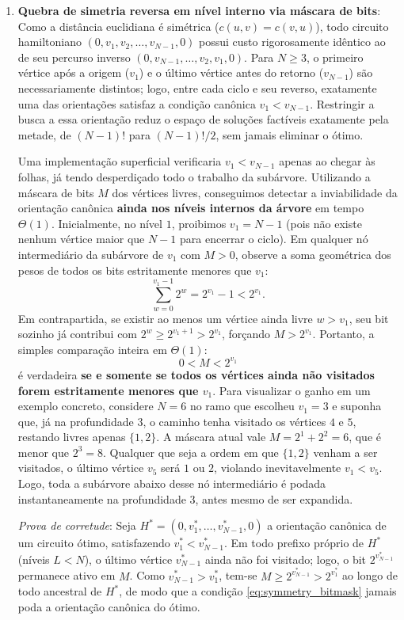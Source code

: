 \begin{enumerate}
  \item \textbf{Quebra de simetria reversa em nível interno via máscara de bits}:
  Como a distância euclidiana é simétrica ($c(u, v) = c(v, u)$), todo circuito hamiltoniano
  $(0, v_1, v_2, \dots, v_{N-1}, 0)$ possui custo rigorosamente idêntico ao de seu percurso
  inverso $(0, v_{N-1}, \dots, v_2, v_1, 0)$. Para $N \ge 3$, o primeiro vértice após a origem
  ($v_1$) e o último vértice antes do retorno ($v_{N-1}$) são necessariamente distintos; logo,
  entre cada ciclo e seu reverso, exatamente uma das orientações satisfaz a condição canônica
  $v_1 < v_{N-1}$. Restringir a busca a essa orientação reduz o espaço de soluções factíveis
  exatamente pela metade, de $(N - 1)!$ para $(N - 1)!/2$, sem jamais eliminar o ótimo.

  Uma implementação superficial verificaria $v_1 < v_{N-1}$ apenas ao chegar às folhas, já tendo
  desperdiçado todo o trabalho da subárvore. Utilizando a máscara de bits $M$ dos vértices
  livres, conseguimos detectar a inviabilidade da orientação canônica \textbf{ainda nos níveis
  internos da árvore} em tempo $\Theta(1)$. Inicialmente, no nível $1$, proibimos $v_1 = N - 1$
  (pois não existe nenhum vértice maior que $N - 1$ para encerrar o ciclo). Em qualquer nó
  intermediário da subárvore de $v_1$ com $M > 0$, observe a soma geométrica dos pesos de todos
  os bits estritamente menores que $v_1$:
  \begin{equation}
    \sum_{w = 0}^{v_1 - 1} 2^w = 2^{v_1} - 1 < 2^{v_1}.
  \end{equation}
  Em contrapartida, se existir ao menos um vértice ainda livre $w > v_1$, seu bit sozinho já
  contribui com $2^w \ge 2^{v_1 + 1} > 2^{v_1}$, forçando $M > 2^{v_1}$. Portanto, a simples
  comparação inteira em $\Theta(1)$:
  \begin{equation}
    0 < M < 2^{v_1}
    \label{eq:symmetry_bitmask}
  \end{equation}
  é verdadeira \textbf{se e somente se todos os vértices ainda não visitados forem estritamente
  menores que $v_1$}. Para visualizar o ganho em um exemplo concreto, considere $N = 6$ no ramo
  que escolheu $v_1 = 3$ e suponha que, já na profundidade $3$, o caminho tenha visitado os
  vértices $4$ e $5$, restando livres apenas $\{1, 2\}$. A máscara atual vale
  $M = 2^1 + 2^2 = 6$, que é menor que $2^3 = 8$. Qualquer que seja a ordem em que $\{1, 2\}$
  venham a ser visitados, o último vértice $v_5$ será $1$ ou $2$, violando inevitavelmente
  $v_1 < v_5$. Logo, toda a subárvore abaixo desse nó intermediário é podada instantaneamente
  na profundidade $3$, antes mesmo de ser expandida.

  \textit{Prova de corretude}: Seja $H^* = (0, v_1^*, \dots, v_{N-1}^*, 0)$ a orientação
  canônica de um circuito ótimo, satisfazendo $v_1^* < v_{N-1}^*$. Em todo prefixo próprio de
  $H^*$ (níveis $L < N$), o último vértice $v_{N-1}^*$ ainda não foi visitado; logo, o bit
  $2^{v_{N-1}^*}$ permanece ativo em $M$. Como $v_{N-1}^* > v_1^*$, tem-se
  $M \ge 2^{v_{N-1}^*} > 2^{v_1^*}$ ao longo de todo ancestral de $H^*$, de modo que a condição
  \eqref{eq:symmetry_bitmask} jamais poda a orientação canônica do ótimo.
\end{enumerate}

